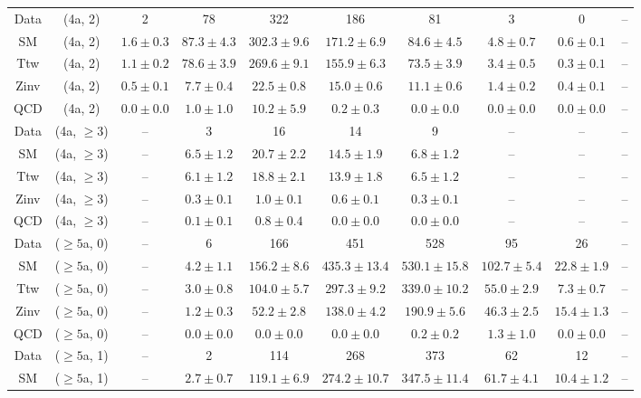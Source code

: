 \begin{table}[h!]
{\begin{tabular}{cccccccccc}
	Data & (4a, 2) & 2 & 78 & 322 & 186 & 81 & 3 & 0 & -- \\[0.5ex] 
	SM & (4a, 2) & $1.6\pm 0.3$ & $87.3\pm 4.3$ & $302.3\pm 9.6$ & $171.2\pm 6.9$ & $84.6\pm 4.5$ & $4.8\pm 0.7$ & $0.6\pm 0.1$ & -- \\[0.5ex] 
	Ttw & (4a, 2) & $1.1\pm 0.2$ & $78.6\pm 3.9$ & $269.6\pm 9.1$ & $155.9\pm 6.3$ & $73.5\pm 3.9$ & $3.4\pm 0.5$ & $0.3\pm 0.1$ & -- \\[0.5ex] 
	Zinv & (4a, 2) & $0.5\pm 0.1$ & $7.7\pm 0.4$ & $22.5\pm 0.8$ & $15.0\pm 0.6$ & $11.1\pm 0.6$ & $1.4\pm 0.2$ & $0.4\pm 0.1$ & -- \\[0.5ex] 
	QCD & (4a, 2) & $0.0\pm 0.0$ & $1.0\pm 1.0$ & $10.2\pm 5.9$ & $0.2\pm 0.3$ & $0.0\pm 0.0$ & $0.0\pm 0.0$ & $0.0\pm 0.0$ & -- \\[0.5ex] 
	Data & (4a, $\ge3$) & -- & 3 & 16 & 14 & 9 & -- & -- & -- \\[0.5ex] 
	SM & (4a, $\ge3$) & -- & $6.5\pm 1.2$ & $20.7\pm 2.2$ & $14.5\pm 1.9$ & $6.8\pm 1.2$ & -- & -- & -- \\[0.5ex] 
	Ttw & (4a, $\ge3$) & -- & $6.1\pm 1.2$ & $18.8\pm 2.1$ & $13.9\pm 1.8$ & $6.5\pm 1.2$ & -- & -- & -- \\[0.5ex] 
	Zinv & (4a, $\ge3$) & -- & $0.3\pm 0.1$ & $1.0\pm 0.1$ & $0.6\pm 0.1$ & $0.3\pm 0.1$ & -- & -- & -- \\[0.5ex] 
	QCD & (4a, $\ge3$) & -- & $0.1\pm 0.1$ & $0.8\pm 0.4$ & $0.0\pm 0.0$ & $0.0\pm 0.0$ & -- & -- & -- \\[0.5ex] 
	Data & ($\ge5$a, 0) & -- & 6 & 166 & 451 & 528 & 95 & 26 & -- \\[0.5ex] 
	SM & ($\ge5$a, 0) & -- & $4.2\pm 1.1$ & $156.2\pm 8.6$ & $435.3\pm 13.4$ & $530.1\pm 15.8$ & $102.7\pm 5.4$ & $22.8\pm 1.9$ & -- \\[0.5ex] 
	Ttw & ($\ge5$a, 0) & -- & $3.0\pm 0.8$ & $104.0\pm 5.7$ & $297.3\pm 9.2$ & $339.0\pm 10.2$ & $55.0\pm 2.9$ & $7.3\pm 0.7$ & -- \\[0.5ex] 
	Zinv & ($\ge5$a, 0) & -- & $1.2\pm 0.3$ & $52.2\pm 2.8$ & $138.0\pm 4.2$ & $190.9\pm 5.6$ & $46.3\pm 2.5$ & $15.4\pm 1.3$ & -- \\[0.5ex] 
	QCD & ($\ge5$a, 0) & -- & $0.0\pm 0.0$ & $0.0\pm 0.0$ & $0.0\pm 0.0$ & $0.2\pm 0.2$ & $1.3\pm 1.0$ & $0.0\pm 0.0$ & -- \\[0.5ex] 
	Data & ($\ge5$a, 1) & -- & 2 & 114 & 268 & 373 & 62 & 12 & -- \\[0.5ex] 
	SM & ($\ge5$a, 1) & -- & $2.7\pm 0.7$ & $119.1\pm 6.9$ & $274.2\pm 10.7$ & $347.5\pm 11.4$ & $61.7\pm 4.1$ & $10.4\pm 1.2$ & -- \\[0.5ex] 

\end{tabular}}
\end{table}
